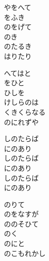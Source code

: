 \documentclass[10pt,b5j]{tarticle} %
\begin{document}
\begin{enumerate}
\begin{minipage}[c]{\blocksize}
        \vspace{\linespace}
        \item
        やをへて\\
        をふき\\
        のをげて\\
        のき\\
        のたるき\\
        はりたり
        
        \vspace{\linespace}
        \item
        へてはと\\
        をひと\\
        ひしを\\
        けしらのは\\
        くきくらなる\\
        のにれずや
        
        \vspace{\linespace}
        \item
        しのたらば\\
        にのあり\\
        しのたらば\\
        にのあり\\
        しのたらば\\
        にのあり
        
        \vspace{\linespace}
        \item
        のりて\\
        のをなすが\\
        ののそひて\\
        のく\\
        のにと\\
        のこもれかし
    
    \end{minipage}
\end{enumerate} %
\end{document}

